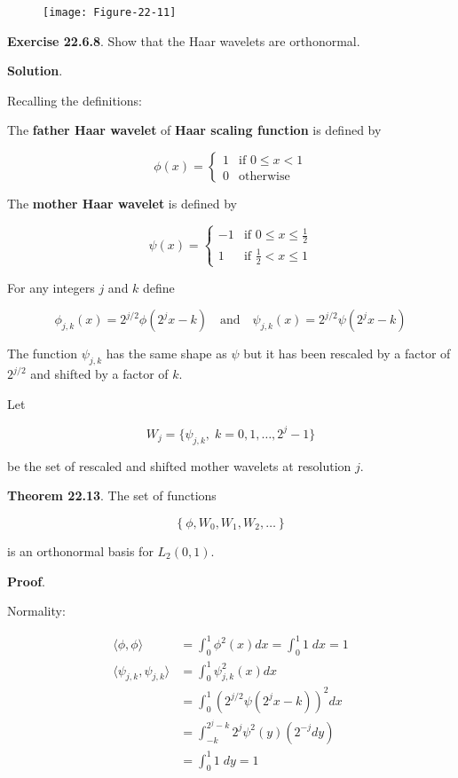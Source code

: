 \begin{figure}[H]
\texttt{[image: Figure-22-11]}
\end{figure}

\textbf{Exercise 22.6.8}. Show that the Haar wavelets are orthonormal.

\textbf{Solution}.

Recalling the definitions:

The \textbf{father Haar wavelet} of \textbf{Haar scaling function} is
defined by

\[ \phi(x) = \begin{cases}
1 & \text{if } 0 \leq x < 1 \\
0 & \text{otherwise}
\end{cases} \]

The \textbf{mother Haar wavelet} is defined by

\[
\psi(x) = \begin{cases}
-1 & \text{if } 0 \leq x \leq \frac{1}{2} \\
1  & \text{if } \frac{1}{2} < x \leq 1
\end{cases}
\]

For any integers \(j\) and \(k\) define

\[ \phi_{j, k}(x) = 2^{j/2} \phi(2^j x - k) 
\quad \text{and} \quad
\psi_{j, k}(x) = 2^{j/2} \psi(2^j x - k)
\]

The function \(\psi_{j, k}\) has the same shape as \(\psi\) but it has
been rescaled by a factor of \(2^{j/2}\) and shifted by a factor of
\(k\).

Let

\[ W_j = \{\psi_{j, k}, \; k = 0, 1, \dots, 2^j - 1\} \]

be the set of rescaled and shifted mother wavelets at resolution \(j\).

\textbf{Theorem 22.13}. The set of functions

\[ \left\{ \phi, W_0, W_1, W_2, \dots \right\} \]

is an orthonormal basis for \(L_2(0, 1)\).

\textbf{Proof}.

Normality:

\[
\begin{align}
\langle \phi, \phi \rangle &= \int_0^1 \phi^2(x) dx = \int_0^1 1 \; dx = 1 \\
\langle \psi_{j, k}, \psi_{j, k} \rangle &= \int_0^1 \psi_{j, k}^2(x) dx \\
&= \int_0^1 \left( 2^{j / 2} \psi(2^j x - k) \right)^2 dx \\
&= \int_{-k}^{2^j - k} 2^j  \psi^2(y) \left( 2^{-j} dy \right) \\
&= \int_0^1 1 \; dy = 1
\end{align}
\]

